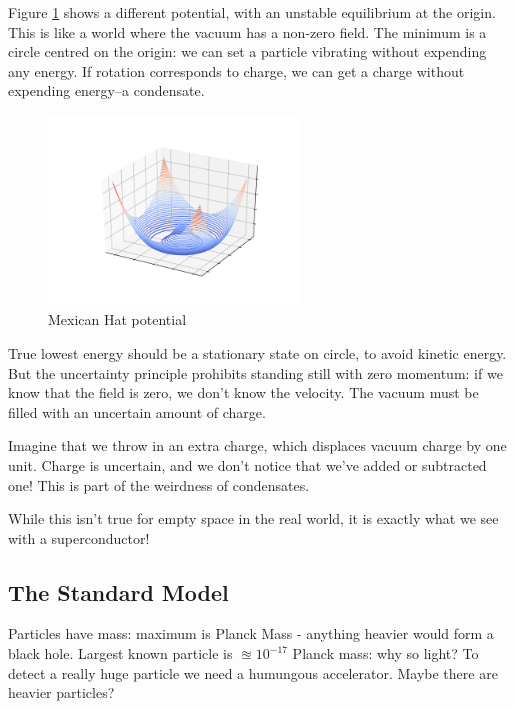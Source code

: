 \documentclass[]{article}
\begin{document}
\begin{appendices}
	Figure \ref{fig:mexican-hat} shows a different potential, with an unstable equilibrium at the origin. This is like a world where the vacuum has a non-zero field. The minimum is a circle centred on the origin: we can set a particle vibrating without expending any energy. If rotation corresponds to charge, we can get a charge without expending energy--a condensate.
	\begin{figure}[H]
		\begin{center}
			\caption{Mexican Hat potential}\label{fig:mexican-hat}
			\includegraphics[width=0.6\textwidth]{mexican-hat}
		\end{center}
	\end{figure}

	True lowest energy should be a stationary state on circle, to avoid kinetic energy. But the uncertainty principle prohibits standing still with zero momentum: if we know that the field is zero, we don't know the velocity. The vacuum must be filled with an uncertain amount of charge.
	
	Imagine that we throw in an extra charge, which displaces vacuum charge by one unit. Charge is uncertain, and we don't notice that we've added or subtracted one! This is part of the weirdness of condensates.
	
	While this isn't true for empty space in the real world, it is exactly what we see with a superconductor!
	
	\subsection{The Standard Model}
	
	Particles have mass: maximum is Planck Mass - anything heavier would form a black hole. Largest known particle is $\approxeq 10^{-17}$ Planck mass: why so light? To detect a really huge particle we need a humungous accelerator. Maybe there are heavier particles?
	

\end{appendices}
\end{document}
